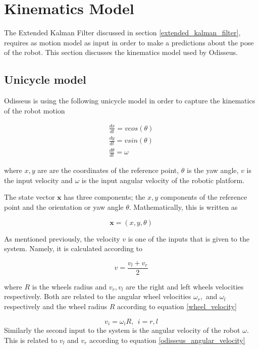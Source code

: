 \section{Kinematics Model}
\label{modeling}
The Extended Kalman Filter discussed in section \ref{extended_kalman_filter}, requires
as motion model as input in order to make a predictions about the
pose of the robot. This section discusses the kinematics model used by Odisseus.

\subsection{Unicycle model}
\label{unicycle_model}

Odisseus is using the following unicycle model in order to capture the kinematics
of the robot motion 

\begin{eqnarray}
\frac{dx}{dt} = v cos(\theta) \\
\frac{dy}{dt} = v sin(\theta) \\
\frac{d\theta}{dt} = \omega
\label{continuous_kinematic_model} 
\end{eqnarray}

where $x,y$ are are the coordinates of the reference point, $\theta$ is the yaw angle, $v$ is the input velocity and $\omega$ is the input angular velocity of the robotic platform.

The state vector $\mathbf{x}$ has three components; the $x, y$ components of the 
reference point and the orientation or yaw angle $\theta$. Mathematically, this is written as

\begin{equation}
\mathbf{x} = (x, y, \theta)
\label{state_vector}
\end{equation}

As mentioned previously, the velocity $v$ is one of the inputs that is given to the system. Namely, it is calculated according to

\begin{equation}
v = \frac{v_l + v_r}{2}
\label{odisseus_velocity}
\end{equation}

where $R$ is the wheels radius and $v_r,v_l$ are the right and left wheels velocities respectively. Both are related to the angular wheel velocities $\omega_r,$ and  $\omega_l$ respectively and the wheel radius $R$ according to equation \ref{wheel_velocity}

\begin{equation}
v_i = \omega_iR, ~~ i = r, l
\label{wheel_velocity}
\end{equation}
Similarly the second input to the system is the angular velocity of 
the robot $\omega$. This is related to $v_l$ and $v_r$ according to equation \ref{odisseus_angular_velocity}

